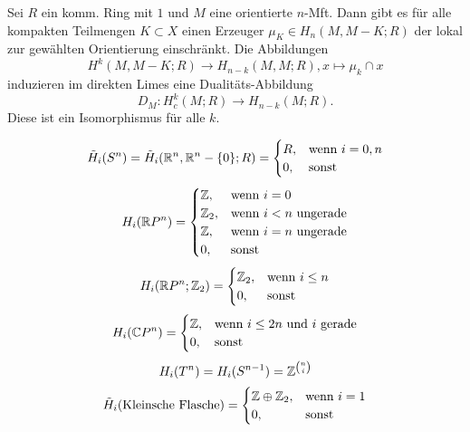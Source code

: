 \documentclass{cheat-sheet}
\newcommand{\RH}{\tilde{H}} %
\newcommand{\ZM}[1]{\Z_{#1}} %
\begin{document}
\begin{satz}
  Sei $R$ ein komm. Ring mit $1$ und $M$ eine orientierte $n$-Mft. Dann gibt es für alle kompakten Teilmengen $K \subset X$ einen Erzeuger $\mu_K \in H_n(M, M-K; R)$ der lokal zur gewählten Orientierung einschränkt. Die Abbildungen
  \[ H^k(M, M - K; R) \to H_{n-k}(M, M; R), x \mapsto \mu_k \cap x \]
  induzieren im direkten Limes eine Dualitäts-Abbildung
  \[ D_M : H^k_c(M; R) \to H_{n-k}(M; R). \]
  Diese ist ein Isomorphismus für alle $k$.
\end{satz}




\begin{bsp}
  \[
    \RH_i(S^n) = \RH_i(\R^n, \R^n - \{0\}; R) = \begin{cases}
      R, & \text{wenn $i=0,n$} \\
      0, & \text{sonst}
    \end{cases}
  \]
  \[
    H_i(\R P^n) = \begin{cases}
      \Z, & \text{wenn $i=0$} \\
      \ZM{2}, & \text{wenn $i < n$ ungerade} \\
      \Z, & \text{wenn $i=n$ ungerade} \\
      0, & \text{sonst}
    \end{cases}
  \]
  \[
    H_i(\R P^n; \ZM{2}) = \begin{cases}
      \ZM{2}, & \text{wenn $i \leq n$} \\
      0, & \text{sonst}
    \end{cases}
  \]
  \[
    H_i(\mathbb{C} P^n) = \begin{cases}
      \mathbb{Z}, & \text{wenn $i \leq 2n$ und $i$ gerade} \\
      0, & \text{sonst}
    \end{cases}
  \]
  \[
    H_i(T^n) = H_i(S^{n-1}) = \mathbb{Z}^{n \choose i}
  \]
  \[
    \RH_i(\text{Kleinsche Flasche}) = \begin{cases}
      \Z \oplus \ZM{2}, & \text{wenn $i=1$} \\
      0, & \text{sonst}
    \end{cases}
  \]
\end{bsp}
\end{document}
